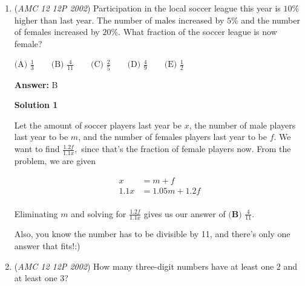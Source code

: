 \begin{enumerate}
 a positive integer?


 $\text{(A) one} \qquad \text{(B) two} \qquad \text{(C) three} \qquad \text{(D) four} \qquad \text{(E) more than four}$

 \textbf{Answer: }C



\textbf{Solution}

For $\frac{2002}{m^2 -2}$ to be an integer, $2002$ must be divisible by $m^2-2.$ Again, memorizing the prime factorization of $2002$ is helpful. $2002 = 2 \cdot 7 \cdot 11 \cdot 13$, so its factors are $1, 2, 7, 11, 13, 14, 22, 26, 77, 91, 143, 154, 182, 286, 1001$, and $2002$. 

 From this adding $2$ to the items in our list and checking if they are perfect squares will suffice. $4, 9,$ and $16$ end up being our perfect squares, giving us an answer of $\boxed{\textbf{(C) } \text{three}}.$



	\item (\textit{AMC 12 12P 2002}) Participation in the local soccer league this year is $10\%$ higher than last year. The number of males increased by $5\%$ and the number of females increased by $20\%$. What fraction of the soccer league is now female?


 $\text{(A) }\frac{1}{3} \qquad \text{(B) }\frac{4}{11} \qquad \text{(C) }\frac{2}{5} \qquad \text{(D) }\frac{4}{9} \qquad \text{(E) }\frac{1}{2}$

 \textbf{Answer: }B



\textbf{Solution 1}

Let the amount of soccer players last year be $x$, the number of male players last year to be $m$, and the number of females players last year to be $f.$ We want to find $\frac{1.2f}{1.1x},$ since that's the fraction of female players now. From the problem, we are given 

 \begin{align*}x&=m+f \\1.1x&=1.05m+1.2f \\\end{align*}


 Eliminating $m$ and solving for $\frac{1.2f}{1.1x}$ gives us our answer of $\boxed{\textbf{(B) } \frac {4}{11}}.$

 Also, you know the number has to be divisible by 11, and there’s only one answer that fits!:)

 


	\item (\textit{AMC 12 12P 2002}) How many three-digit numbers have at least one $2$ and at least one $3$?



\end{enumerate}
